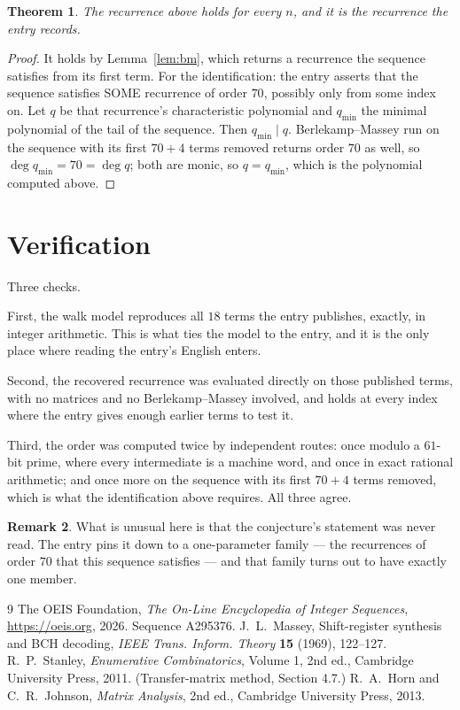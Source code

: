 \documentclass[11pt,a4paper]{article}
\theoremstyle{plain}
\newtheorem{theorem}{Theorem}
\theoremstyle{definition}
\newtheorem{remark}[theorem]{Remark}
\begin{document}
\begin{theorem}
The recurrence above holds for every $n$, and it is the recurrence the entry records.
\end{theorem}

\begin{proof}
It holds by Lemma~\ref{lem:bm}, which returns a recurrence the sequence satisfies from its
first term. For the identification: the entry asserts that the sequence satisfies SOME
recurrence of order $70$, possibly only from some index on. Let $q$ be that recurrence's
characteristic polynomial and $q_{\min}$ the minimal polynomial of the tail of the sequence.
Then $q_{\min}\mid q$. Berlekamp--Massey run on the sequence with its first $70+4$ terms
removed returns order $70$ as well, so $\deg q_{\min}=70=\deg q$; both are monic, so
$q=q_{\min}$, which is the polynomial computed above.
\end{proof}

\section{Verification}

Three checks.

First, the walk model reproduces all $18$ terms the entry publishes, exactly, in integer
arithmetic. This is what ties the model to the entry, and it is the only place where reading
the entry's English enters.

Second, the recovered recurrence was evaluated directly on those published terms, with no
matrices and no Berlekamp--Massey involved, and holds at every index where the entry gives
enough earlier terms to test it.

Third, the order was computed twice by independent routes: once modulo a $61$-bit prime, where
every intermediate is a machine word, and once in exact rational arithmetic; and once more on
the sequence with its first $70+4$ terms removed, which is what the identification above
requires. All three agree.

\begin{remark}
What is unusual here is that the conjecture's statement was never read. The entry pins it down
to a one-parameter family --- the recurrences of order $70$ that this sequence satisfies
--- and that family turns out to have exactly one member.
\end{remark}

\begin{thebibliography}{9}
 The OEIS Foundation, \emph{The On-Line Encyclopedia of Integer
Sequences}, \url{https://oeis.org}, 2026. Sequence A295376.
 J.~L.~Massey, Shift-register synthesis and BCH decoding, \emph{IEEE
Trans. Inform. Theory} \textbf{15} (1969), 122--127.
 R.~P.~Stanley, \emph{Enumerative Combinatorics}, Volume 1, 2nd ed.,
Cambridge University Press, 2011. (Transfer-matrix method, Section 4.7.)
 R.~A.~Horn and C.~R.~Johnson, \emph{Matrix Analysis}, 2nd ed., Cambridge
University Press, 2013.
\end{thebibliography}
\end{document}
